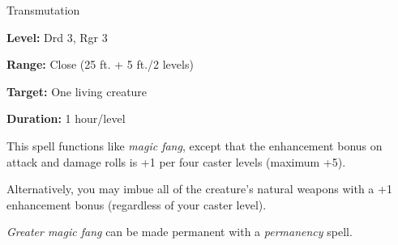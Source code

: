 \label{spell:Greater Magic Fang}

Transmutation

\textbf{Level:} Drd 3, Rgr 3

\textbf{Range:} Close (25 ft. + 5 ft./2 levels)

\textbf{Target:} One living creature

\textbf{Duration:} 1 hour/level

This spell functions like \textit{magic fang}, except that the enhancement bonus 
on attack and damage rolls is +1 per four caster levels (maximum +5).

Alternatively, you may imbue all of the creature's natural weapons with a +1 enhancement 
bonus (regardless of your caster level).

\textit{Greater magic fang} can be made permanent with a \textit{permanency} spell.

